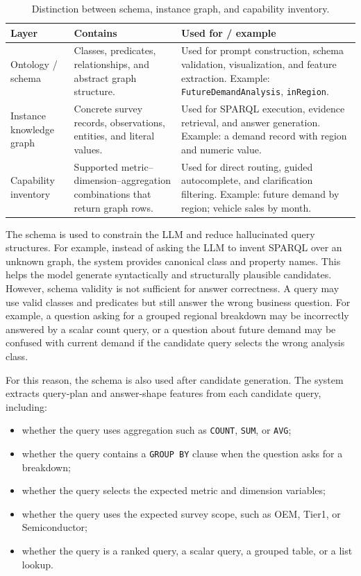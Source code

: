 \documentclass[
  12pt,
  english,
  oneside]{report}
\begin{document}
\begin{table}[htbp]
\centering
\caption{Distinction between schema, instance graph, and capability inventory.}
\label{tab:kg-schema-capability-layers}
\small
\begin{tabularx}{\textwidth}{
>{\raggedright\arraybackslash}p{3.2cm}
>{\raggedright\arraybackslash}p{5.2cm}
>{\raggedright\arraybackslash}X
}
\toprule
\textbf{Layer} & \textbf{Contains} & \textbf{Used for / example} \\
\midrule
Ontology / schema 
& Classes, predicates, relationships, and abstract graph structure. 
& Used for prompt construction, schema validation, visualization, and feature extraction. Example: \texttt{FutureDemandAnalysis}, \texttt{inRegion}. \\

Instance knowledge graph 
& Concrete survey records, observations, entities, and literal values. 
& Used for SPARQL execution, evidence retrieval, and answer generation. Example: a demand record with region and numeric value. \\

Capability inventory 
& Supported metric--dimension--aggregation combinations that return graph rows. 
& Used for direct routing, guided autocomplete, and clarification filtering. Example: future demand by region; vehicle sales by month. \\
\bottomrule
\end{tabularx}
\end{table}

The schema is used to constrain the LLM and reduce hallucinated query structures. For example, instead of asking the LLM to invent SPARQL over an unknown graph, the system provides canonical class and property names. This helps the model generate syntactically and structurally plausible candidates. However, schema validity is not sufficient for answer correctness. A query may use valid classes and predicates but still answer the wrong business question. For example, a question asking for a grouped regional breakdown may be incorrectly answered by a scalar count query, or a question about future demand may be confused with current demand if the candidate query selects the wrong analysis class.

For this reason, the schema is also used after candidate generation. The system extracts query-plan and answer-shape features from each candidate query, including:

\begin{itemize}
    \item whether the query uses aggregation such as \texttt{COUNT}, \texttt{SUM}, or \texttt{AVG};
    \item whether the query contains a \texttt{GROUP BY} clause when the question asks for a breakdown;
    \item whether the query selects the expected metric and dimension variables;
    \item whether the query uses the expected survey scope, such as OEM, Tier1, or Semiconductor;
    \item whether the query is a ranked query, a scalar query, a grouped table, or a list lookup.
\end{itemize}
\end{document}
